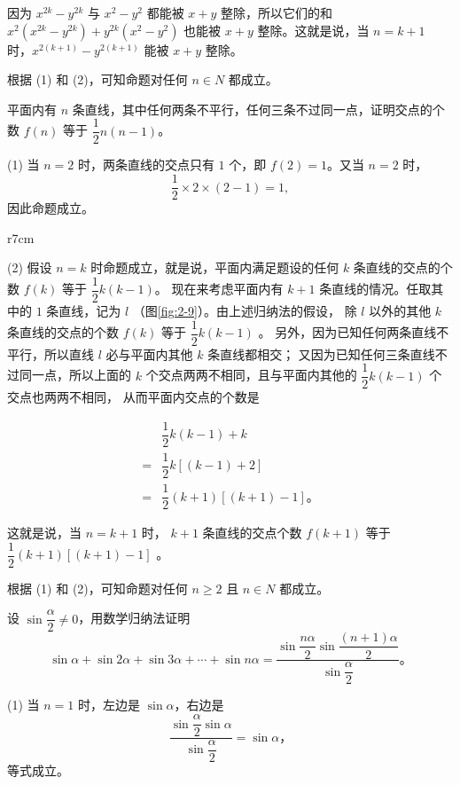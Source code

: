 因为 $x^{2k} - y^{2k}$ 与 $x^2 - y^2$ 都能被 $x + y$ 整除，所以它们的和 $x^2(x^{2k} - y^{2k}) + y^{2k}(x^2 - y^2)$
也能被 $x + y$ 整除。这就是说，当 $n = k + 1$ 时，$x^{2(k+1)} - y^{2(k+1)}$ 能被 $x + y$ 整除。

根据 (1) 和 (2)，可知命题对任何 $n \in N$ 都成立。


\liti 平面内有 $n$ 条直线，其中任何两条不平行，任何三条不过同一点，证明交点的个数 $f(n)$ 等于 $\dfrac{1}{2} n(n-1)$。

\zhengming (1) 当 $n = 2$ 时，两条直线的交点只有 $1$ 个，即 $f(2) = 1$。又当 $n = 2$ 时，
$$ \dfrac{1}{2} \times 2 \times (2 - 1) = 1 ,$$
因此命题成立。


\begin{wrapfigure}[10]{r}{7cm}
  \centering
  
  \caption{}\label{fig:2-9}
\end{wrapfigure}

(2) 假设 $n = k$ 时命题成立，就是说，平面内满足题设的任何 $k$ 条直线的交点的个数 $f(k)$ 等于 $\dfrac{1}{2} k(k - 1)$。
现在来考虑平面内有 $k + 1$ 条直线的情况。任取其中的 $1$ 条直线，记为 $l$ （图\ref{fig:2-9}）。由上述归纳法的假设，
除 $l$ 以外的其他 $k$ 条直线的交点的个数 $f(k)$ 等于 $\dfrac{1}{2} k(k - 1)$ 。
另外，因为已知任何两条直线不平行，所以直线 $l$ 必与平面内其他 $k$ 条直线都相交；
又因为已知任何三条直线不过同一点，所以上面的 $k$ 个交点两两不相同，且与平面内其他的 $\dfrac{1}{2} k(k - 1)$ 个交点也两两不相同，
从而平面内交点的个数是

\begin{align*}
      & \dfrac{1}{2} k(k - 1) + k \\
    = & \dfrac{1}{2} k[(k - 1) + 2] \\
    = & \dfrac{1}{2} (k+1) [(k+1) - 1] \text{。}
\end{align*}

这就是说，当 $n=k+1$ 时， $k+1$ 条直线的交点个数 $f(k+1)$ 等于 $\dfrac{1}{2} (k+1) [(k+1) - 1]$ 。

根据 (1) 和 (2)，可知命题对任何 $n \geqslant 2$ 且 $n \in N$ 都成立。


\liti 设 $\sin\dfrac{\alpha}{2} \neq 0$，用数学归纳法证明
$$ \sin \alpha + \sin 2\alpha + \sin 3\alpha + \cdots + \sin n\alpha = \dfrac{\sin \dfrac{n\alpha}{2} \sin \dfrac{(n+1)\alpha}{2}}{\sin \dfrac{\alpha}{2}} \text{。} $$

\zhengming (1) 当 $n = 1$ 时，左边是 $\sin\alpha$，右边是
$$ \dfrac{\sin \dfrac{\alpha}{2} \sin \alpha}{\sin \dfrac{\alpha}{2}} = \sin\alpha \text{，} $$
等式成立。

